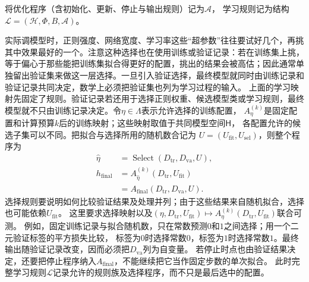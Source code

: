 将优化程序（含初始化、更新、停止与输出规则）记为$\mathscr A$，
学习规则记为结构$\mathcal L=(\mathcal H,\Phi,B,\mathscr A)$。

实际调模型时，正则强度、网络宽度、学习率这些“超参数”往往要试好几个，再挑其中效果最好的一个。注意这种选择也在使用训练或验证记录：若在训练集上挑，等于偏心于那些能把训练集拟合得更好的配置，挑出的结果会被高估；因此通常单独留出验证集来做这一层选择。一旦引入验证选择，最终模型就同时由训练记录和验证记录共同决定，数学上必须把验证集也列为学习过程的输入。
上面的学习映射先固定了规则。验证记录若还用于选择正则权重、候选模型类或学习规则，最终模型就不只由训练记录决定。令$\eta\in\Lambda$表示允许选择的训练配置，
$A_\eta^{(k)}$是固定配置和计算预算$k$后的训练映射；这些映射取值于共同模型空间$\mathsf H$，
各配置允许的候选子集可以不同。把拟合与选择所用的随机数合记为
$U=(U_{\mathrm{fit}},U_{\mathrm{sel}})$，则整个程序为
\begin{equation}
  \begin{aligned}
    \widehat\eta
      &=\operatorname{Select}(D_{\mathrm{tr}},D_{\mathrm{va}},U),\\
    h_{\mathrm{final}}
      &=A_{\widehat\eta}^{(k)}(D_{\mathrm{tr}},U_{\mathrm{fit}})\\
      &=A_{\mathrm{final}}(D_{\mathrm{tr}},D_{\mathrm{va}},U).
  \end{aligned}
  \label{eq:future-validation-selected-output}
\end{equation}
选择规则要说明如何比较验证结果及处理并列；由于这些结果来自随机拟合，选择也可能依赖$U_{\mathrm{fit}}$。
这里要求选择映射以及$(\eta,D_{\mathrm{tr}},U_{\mathrm{fit}})\mapsto A_\eta^{(k)}(D_{\mathrm{tr}},U_{\mathrm{fit}})$联合可测。
例如，固定训练记录与拟合随机数，只在常数预测$0$和$1$之间选择；用一个二元验证标签的平方损失比较，
标签为$0$时选择常数$0$，标签为$1$时选择常数$1$。最终输出随验证记录改变，因而必须把$D_{\mathrm{va}}$列为自变量。
若停止时点也由验证结果决定，还要把停止程序纳入$A_{\mathrm{final}}$，不能继续把它当作固定步数的单次拟合。
此时完整学习规则$\mathcal L$记录允许的规则族及选择程序，而不只是最后选中的配置。


